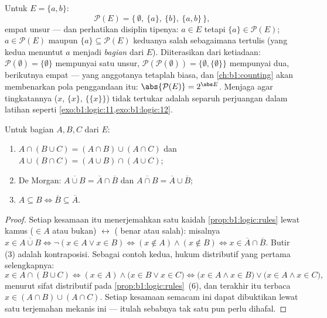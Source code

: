 \begin{example}\label{ex:b1:logic:powerset}
Untuk $E = \{a, b\}$:
\[
\mathcal P(E) = \bigl\{\, \emptyset,\ \{a\},\ \{b\},\ \{a, b\}
\,\bigr\},
\]
empat unsur --- dan perhatikan disiplin tipenya: $a \in E$ tetapi
$\{a\} \in \mathcal P(E)$;  $a \in \mathcal P(E)$
maupun $\{a\} \subseteq \mathcal P(E)$ keduanya salah sebagaimana
tertulis (yang kedua menuntut $a$ menjadi \emph{ bagian} dari
$E$). Diiterasikan dari ketiadaan: $\mathcal P(\emptyset) =
\{\emptyset\}$ mempunyai satu unsur, $\mathcal P(\mathcal P(\emptyset))
= \{\emptyset, \{\emptyset\}\}$ mempunyai dua, berikutnya empat ---
 yang anggotanya  tetaplah  biasa, dan
\cref{ch:b1:counting} akan membenarkan pola penggandaan itu:
$\abs{\mathcal P(E)} = 2^{\abs E}$. Menjaga agar tingkatannya
($x$, $\{x\}$, $\{\{x\}\}$) tidak tertukar adalah separuh perjuangan
dalam latihan seperti \cref{exo:b1:logic:11,exo:b1:logic:12}.
\end{example}

\begin{proposition}\label{prop:b1:logic:setalgebra}
Untuk  bagian $A, B, C$ dari $E$:
\begin{enumerate}
  \item $A \cap (B \cup C) = (A \cap B) \cup (A \cap C)$ dan
        $A \cup (B \cap C) = (A \cup B) \cap (A \cup C)$;
  \item De Morgan: $\overline{A \cup B} = \overline{A} \cap
        \overline{B}$ dan $\overline{A \cap B} = \overline{A} \cup
        \overline{B}$;
  \item $A \subseteq B \iff \overline{B} \subseteq \overline{A}$.
\end{enumerate}
\end{proposition}

\begin{proof}
Setiap kesamaan itu menerjemahkan satu kaidah
\cref{prop:b1:logic:rules} lewat kamus ($\in A$ atau bukan)
$\leftrightarrow$ ( benar atau
salah): misalnya $x \in \overline{A \cup B} \iff \lnot(x \in A \lor x \in
B) \iff (x \notin A) \land (x \notin B) \iff x \in \overline{A} \cap
\overline{B}$. Butir (3) adalah kontraposisi. Sebagai contoh kedua,
hukum distributif yang pertama selengkapnya:
\[
x \in A \cap (B \cup C)
\iff (x \in A) \land \bigl(x \in B \lor x \in C\bigr)
\iff \bigl(x \in A \land x \in B\bigr) \lor
\bigl(x \in A \land x \in C\bigr),
\]
menurut sifat distributif pada \cref{prop:b1:logic:rules}~(6), dan
 terakhir itu terbaca $x \in (A \cap B) \cup (A \cap C)$.
Setiap kesamaan  semacam ini dapat dibuktikan lewat satu
terjemahan mekanis ini --- itulah sebabnya tak satu pun perlu dihafal.
\end{proof}

